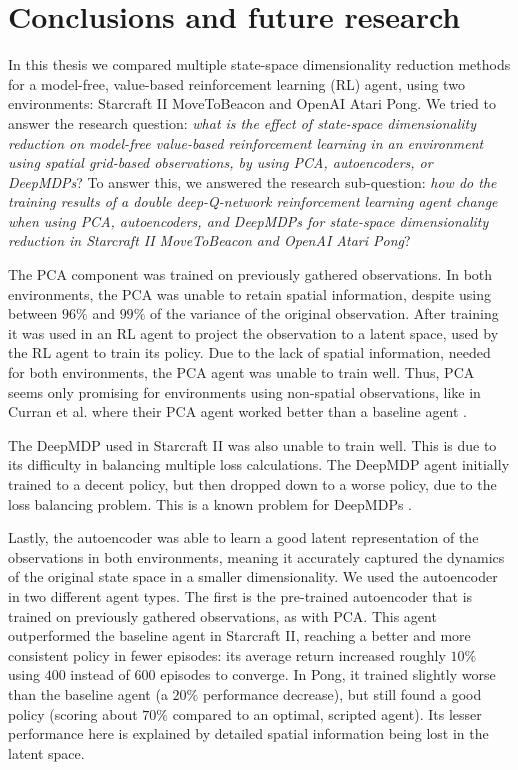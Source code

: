 \chapter{Conclusions and future research}\label{conclusions}
In this thesis we compared multiple state-space dimensionality reduction methods for a model-free, value-based reinforcement learning (RL) agent, using two environments: Starcraft II MoveToBeacon and OpenAI Atari Pong. We tried to answer the research question: \textit{what is the effect of state-space dimensionality reduction on model-free value-based reinforcement learning in an environment using spatial grid-based observations, by using PCA, autoencoders, or DeepMDPs}? To answer this, we answered the research sub-question: \textit{how do the training results of a double deep-Q-network reinforcement learning agent change when using PCA, autoencoders, and DeepMDPs for state-space dimensionality reduction in Starcraft II MoveToBeacon and OpenAI Atari Pong}? 

The PCA component was trained on previously gathered observations. In both environments, the PCA was unable to retain spatial information, despite using between $96\%$ and $99\%$ of the variance of the original observation. After training it was used in an RL agent to project the observation to a latent space, used by the RL agent to train its policy. Due to the lack of spatial information, needed for both environments, the PCA agent was unable to train well. Thus, PCA seems only promising for environments using non-spatial observations, like in Curran et al. where their PCA agent worked better than a baseline agent \cite{mario}.

The DeepMDP used in Starcraft II was also unable to train well. This is due to its difficulty in balancing multiple loss calculations. The DeepMDP agent initially trained to a decent policy, but then dropped down to a worse policy, due to the loss balancing problem. This is a known problem for DeepMDPs \cite{deepmdp}.

Lastly, the autoencoder was able to learn a good latent representation of the observations in both environments, meaning it accurately captured the dynamics of the original state space in a smaller dimensionality. We used the autoencoder in two different agent types. The first is the pre-trained autoencoder that is trained on previously gathered observations, as with PCA. This agent outperformed the baseline agent in Starcraft II, reaching a better and more consistent policy in fewer episodes: its average return increased roughly $10\%$ using $400$ instead of $600$ episodes to converge. In Pong, it trained slightly worse than the baseline agent (a $20\%$ performance decrease), but still found a good policy (scoring about $70\%$ compared to an optimal, scripted agent). Its lesser performance here is explained by detailed spatial information being lost in the latent space.

